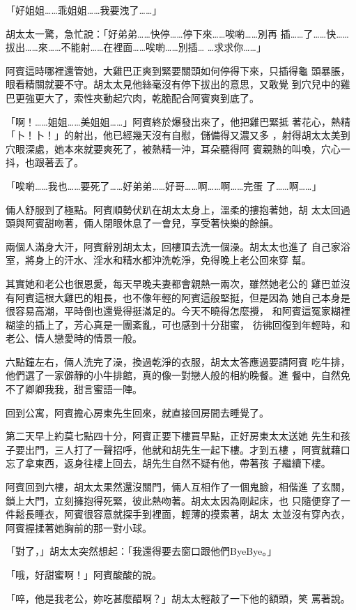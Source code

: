 「好姐姐……乖姐姐……我要洩了……」

胡太太一驚，急忙說：「好弟弟……快停……停下來……唉喲……別再
插……了……快……拔出……來……不能射……在裡面……唉喲……別插…
…求求你……」

阿賓這時哪裡還管她，大雞巴正爽到緊要關頭如何停得下來，只插得龜
頭暴脹，眼看精關就要不守。胡太太見他絲毫沒有停下拔出的意思，又敢覺
到穴兒中的雞巴更強更大了，索性夾動起穴肉，乾脆配合阿賓爽到底了。

「啊！……姐姐……美姐姐……」阿賓終於爆發出來了，他把雞巴緊抵
著花心，熱精「卜！卜！」的射出，他已經幾天沒有自慰，儲備得又濃又多
，射得胡太太美到穴眼深處，她本來就要爽死了，被熱精一沖，耳朵聽得阿
賓親熱的叫喚，穴心一抖，也跟著丟了。

「唉喲……我也……要死了……好弟弟……好哥……啊……啊……完蛋
了……啊……」

倆人舒服到了極點。阿賓順勢伏趴在胡太太身上，溫柔的摟抱著她，胡
太太回過頭與阿賓甜吻著，倆人閉眼休息了一會兒，享受著快樂的餘韻。

兩個人滿身大汗，阿賓辭別胡太太，回樓頂去洗一個澡。胡太太也進了
自己家浴室，將身上的汗水、淫水和精水都沖洗乾淨，免得晚上老公回來穿
幫。

其實她和老公也很恩愛，每天早晚夫妻都會親熱一兩次，雖然她老公的
雞巴並沒有阿賓這根大雞巴的粗長，也不像年輕的阿賓這般堅挺，但是因為
她自己本身是很容易高潮，平時倒也還覺得挺滿足的。今天不曉得怎麼攪，
和阿賓這冤家糊裡糊塗的插上了，芳心真是一團紊亂，可也感到十分甜蜜，
彷彿回復到年輕時，和老公、情人戀愛時的情景一般。

六點鐘左右，倆人洗完了澡，換過乾淨的衣服，胡太太答應過要請阿賓
吃牛排，他們選了一家僻靜的小牛排館，真的像一對戀人般的相約晚餐。進
餐中，自然免不了卿卿我我，甜言蜜語一陣。

回到公寓，阿賓擔心房東先生回來，就直接回房間去睡覺了。

第二天早上約莫七點四十分，阿賓正要下樓買早點，正好房東太太送她
先生和孩子要出門，三人打了一聲招呼，他就和胡先生一起下樓。才到五樓
，阿賓就藉口忘了拿東西，返身往樓上回去，胡先生自然不疑有他，帶著孩
子繼續下樓。

阿賓回到六樓，胡太太果然還沒關門，倆人互相作了一個鬼臉，相偕進
了玄關，鎖上大門，立刻擁抱得死緊，彼此熱吻著。胡太太因為剛起床，也
只隨便穿了一件鬆長睡衣，阿賓很容意就探手到裡面，輕薄的摸索著，胡太
太並沒有穿內衣，阿賓握揉著她胸前的那一對小球。

「對了，」胡太太突然想起：「我還得要去窗口跟他們ByeBye。」

「哦，好甜蜜啊！」阿賓酸酸的說。

「啐，他是我老公，妳吃甚麼醋啊？」胡太太輕敲了一下他的額頭，笑
罵著說。

